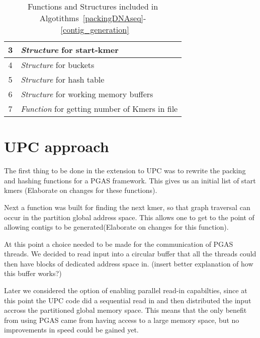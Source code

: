 \documentclass{article}
\newcounter{codecounter}
\newcommand{\mycode}[4]{
  \vspace{1em}
  \begin{mdframed}[backgroundcolor=DarkGray, topline=false,bottomline=false,leftline=false,rightline=false]
  \refstepcounter{codecounter}Algorithm \thecodecounter: #2 \label{#1}
  \end{mdframed}
  \begin{mdframed}[backgroundcolor=LightGray, topline=false, bottomline=false, leftline=false, rightline=false]
    \inputminted
    [
      baselinestretch = 1.2,
      linenos,
      mathescape  = true,
      firstnumber = 1,
      fontsize=\small
    ]{#4}{#3}
  \end{mdframed}
  \begin{mdframed}[backgroundcolor=DarkGray, topline=false,bottomline=false,leftline=false,rightline=false]
  Algorithm \thecodecounter: #2
  \end{mdframed}
  \vspace{1em}
}
\begin{document}
\begin{enumerate}
\begin{table}
\begin{tabular}[t]{|c|p{3.2cm}|}
        3&\emph{Structure} for start-kmer \\ \hline   
        4&\emph{Structure} for buckets\\ \hline
        5&\emph{Structure} for hash table \\ \hline   
        6&\emph{Structure} for working memory buffers\\ \hline   
        7&\emph{Function} for getting number of Kmers in file \\ \hline   
    \end{tabular}
    \caption{Functions and Structures included in Algotithms~\ref{packingDNAseq}- ~\ref{contig_generation}}
\end{table}







\section{UPC approach}
The first thing to be done in the extension to UPC was to rewrite the packing and hashing functions for a PGAS framework. This gives us an initial list of start kmers ({\color{red}Elaborate on changes for these functions}). 

Next a function was built for finding the next kmer, so that graph traversal can occur in the partition global address space. This allows one to get to the point of allowing contigs to be generated({\color{red}Elaborate on changes for this function}).

At this point a choice needed to be made for the communication of PGAS threads. We decided to read input into a circular buffer that all the threads could then have blocks of dedicated address space in. ({\color{red}insert better explanation of how this buffer works?})

Later we considered the option of enabling parallel read-in capabilties, since at this point the UPC code did a sequential read in and then distributed the input accross the partitioned global memory space. This means that the only benefit from using PGAS came from having access to a large memory space, but no improvements in speed could be gained yet. 


\end{enumerate}
\end{document}
